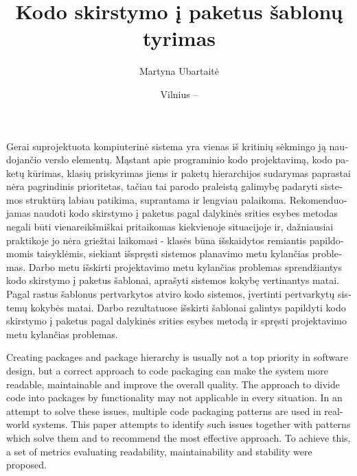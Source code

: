 \documentclass[
]{VUMIFPSbakalaurinis}
\title{Kodo skirstymo į paketus šablonų tyrimas}
\author{Martyna Ubartaitė}
\date{Vilnius – \the\year}
\begin{document}
\maketitle


\begin{lithuanian}
Gerai suprojektuota kompiuterinė sistema yra vienas iš kritinių sėkmingo ją naudojančio verslo
elementų.
Mąstant apie programinio kodo
projektavimą, kodo paketų kūrimas, klasių priskyrimas jiems ir paketų hierarchijos sudarymas paprastai
nėra pagrindinis prioritetas, tačiau tai parodo praleistą galimybę padaryti sistemos struktūrą labiau
patikima, suprantama ir lengviau palaikoma.
Rekomenduojamas naudoti kodo skirstymo į paketus pagal dalykinės srities esybes metodas negali būti vienareikšmiškai pritaikomas
kiekvienoje situacijoje ir, dažniausiai praktikoje jo nėra griežtai laikomasi - klasės būna išskaidytos remiantis papildomomis taisyklėmis,
siekiant išspręsti sistemos planavimo metu kylančias problemas.
Darbo metu išskirti projektavimo metu kylančias problemas sprendžiantys kodo skirstymo į paketus šablonai, aprašyti sistemos
kokybę vertinantys matai.
Pagal rastus šablonus pertvarkytos atviro kodo sistemos, įvertinti pertvarkytų sistemų kokybės matai.
Darbo rezultatuose išskirti šablonai galintys papildyti kodo skirstymo į paketus pagal dalykinės srities esybes metodą ir spręsti
projektavimo metu kylančias problemas.

\end{lithuanian}

\begin{english}
Creating packages and package hierarchy is usually not a top priority in software design, but
a correct approach to code packaging can make the system more readable, maintainable and improve the overall quality.
The approach to divide code into packages by functionality may not applicable in every situation.
In an attempt to solve these issues, multiple code packaging patterns are used in real-world systems.
This paper attempts to identify such issues together with patterns which solve them and to recommend the most effective approach.
To achieve this, a set of metrics evaluating readability, maintainability and stability were proposed.

\end{english}
\end{document}
